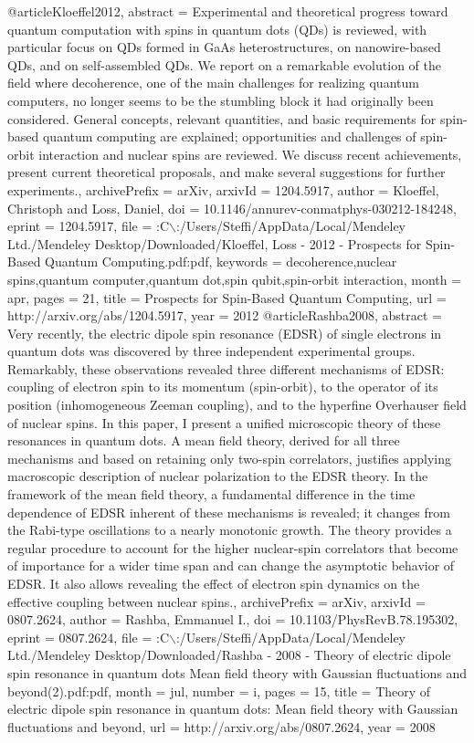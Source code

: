 @article{Kloeffel2012,
abstract = {Experimental and theoretical progress toward quantum computation with spins in quantum dots (QDs) is reviewed, with particular focus on QDs formed in GaAs heterostructures, on nanowire-based QDs, and on self-assembled QDs. We report on a remarkable evolution of the field where decoherence, one of the main challenges for realizing quantum computers, no longer seems to be the stumbling block it had originally been considered. General concepts, relevant quantities, and basic requirements for spin-based quantum computing are explained; opportunities and challenges of spin-orbit interaction and nuclear spins are reviewed. We discuss recent achievements, present current theoretical proposals, and make several suggestions for further experiments.},
archivePrefix = {arXiv},
arxivId = {1204.5917},
author = {Kloeffel, Christoph and Loss, Daniel},
doi = {10.1146/annurev-conmatphys-030212-184248},
eprint = {1204.5917},
file = {:C$\backslash$:/Users/Steffi/AppData/Local/Mendeley Ltd./Mendeley Desktop/Downloaded/Kloeffel, Loss - 2012 - Prospects for Spin-Based Quantum Computing.pdf:pdf},
keywords = {decoherence,nuclear spins,quantum computer,quantum dot,spin qubit,spin-orbit interaction},
month = {apr},
pages = {21},
title = {{Prospects for Spin-Based Quantum Computing}},
url = {http://arxiv.org/abs/1204.5917},
year = {2012}
}
@article{Rashba2008,
abstract = {Very recently, the electric dipole spin resonance (EDSR) of single electrons in quantum dots was discovered by three independent experimental groups. Remarkably, these observations revealed three different mechanisms of EDSR: coupling of electron spin to its momentum (spin-orbit), to the operator of its position (inhomogeneous Zeeman coupling), and to the hyperfine Overhauser field of nuclear spins. In this paper, I present a unified microscopic theory of these resonances in quantum dots. A mean field theory, derived for all three mechanisms and based on retaining only two-spin correlators, justifies applying macroscopic description of nuclear polarization to the EDSR theory. In the framework of the mean field theory, a fundamental difference in the time dependence of EDSR inherent of these mechanisms is revealed; it changes from the Rabi-type oscillations to a nearly monotonic growth. The theory provides a regular procedure to account for the higher nuclear-spin correlators that become of importance for a wider time span and can change the asymptotic behavior of EDSR. It also allows revealing the effect of electron spin dynamics on the effective coupling between nuclear spins.},
archivePrefix = {arXiv},
arxivId = {0807.2624},
author = {Rashba, Emmanuel I.},
doi = {10.1103/PhysRevB.78.195302},
eprint = {0807.2624},
file = {:C$\backslash$:/Users/Steffi/AppData/Local/Mendeley Ltd./Mendeley Desktop/Downloaded/Rashba - 2008 - Theory of electric dipole spin resonance in quantum dots Mean field theory with Gaussian fluctuations and beyond(2).pdf:pdf},
month = {jul},
number = {i},
pages = {15},
title = {{Theory of electric dipole spin resonance in quantum dots: Mean field theory with Gaussian fluctuations and beyond}},
url = {http://arxiv.org/abs/0807.2624},
year = {2008}
}
